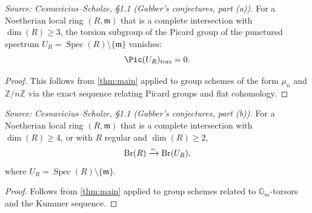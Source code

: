 %
\begin{corollary}
  \label{cor:gabber_pic}
  \textit{Source: Cesnavicius--Scholze, §1.1 (Gabber's conjectures, part (a)).}
  For a Noetherian local ring \((R, \mathfrak{m})\) that is a complete intersection with \(\dim(R) \ge 3\), the torsion subgroup of the Picard group of the punctured spectrum \(U_R = \operatorname{Spec}(R) \setminus \{\mathfrak{m}\}\) vanishes:
  \[
    \Pic(U_R)_{\mathrm{tors}} = 0.
  \]
\end{corollary}

\begin{proof}
  \uses{}
  This follows from \cref{thm:main} applied to group schemes of the form \(\mu_n\) and \(\mathbb{Z}/n\mathbb{Z}\) via the exact sequence relating Picard groups and flat cohomology.
\end{proof}

\begin{corollary}
  \label{cor:gabber_brauer}
  \textit{Source: Cesnavicius--Scholze, §1.1 (Gabber's conjectures, part (b)).}
  For a Noetherian local ring \((R, \mathfrak{m})\) that is a complete intersection with \(\dim(R) \ge 4\), or with \(R\) regular and \(\dim(R) \ge 2\),
  \[
    \operatorname{Br}(R) \xrightarrow{\sim} \operatorname{Br}(U_R),
  \]
  where \(U_R = \operatorname{Spec}(R) \setminus \{\mathfrak{m}\}\).
\end{corollary}

\begin{proof}
  \uses{}
  Follows from \cref{thm:main} applied to group schemes related to \(\mathbb{G}_m\)-torsors and the Kummer sequence.
\end{proof}


